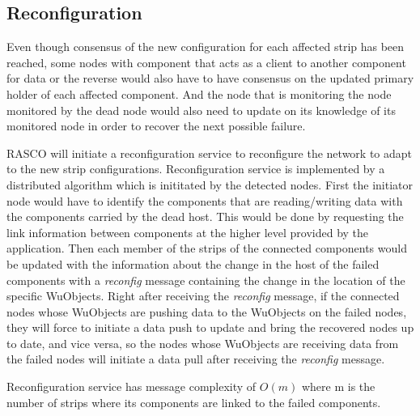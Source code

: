 
\subsection{Reconfiguration}
\label{s:reconfig}

Even though consensus of the new configuration for each affected strip has been
reached, some nodes with component that acts as a client to another component
for data or the reverse would also have to have consensus on the updated
primary holder of each affected component. And the node that is monitoring the
node monitored by the dead node would also need to update on its knowledge of
its monitored node in order to recover the next possible failure.

RASCO will initiate a reconfiguration service to reconfigure the network to adapt
to the new strip configurations. Reconfiguration service is implemented by
a distributed algorithm which is inititated by the detected nodes. First the
initiator node would have to identify the components that are reading/writing
data with the components carried by the dead host. This would be done by
requesting the link information between components at the higher level provided
by the application. Then each member of the strips of the connected components
would be updated with the information about the change in the host of the
failed components with a \emph{reconfig} message containing the change in the
location of the specific WuObjects. Right after receiving the \emph{reconfig}
message, if the connected nodes whose WuObjects are pushing data to the
WuObjects on the failed nodes, they will force to initiate a data push to
update and bring the recovered nodes up to date, and vice versa, so the nodes
whose WuObjects are receiving data from the failed nodes will initiate a data
pull after receiving the \emph{reconfig} message.




Reconfiguration service has message complexity of $O(m)$ where m is the
number of strips where its components are linked to the failed components.

